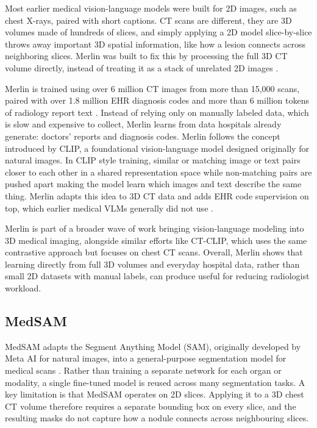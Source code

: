 Most earlier medical vision-language models were built for 2D images, such as chest X-rays, paired with short captions. CT scans are different,
they are 3D volumes made of hundreds of slices, and simply applying a 2D model slice-by-slice throws away important 3D spatial information,
like how a lesion connects across neighboring slices. Merlin was built to fix this by processing the full 3D CT volume directly,
instead of treating it as a stack of unrelated 2D images \cite{Blankemeier_2026}.

Merlin is trained using over 6 million CT images from more than 15,000 scans, paired with over 1.8 million EHR diagnosis codes and more than 6 million
tokens of radiology report text \cite{Blankemeier_2026}. Instead of relying only on manually labeled data, which is slow and expensive to collect,
Merlin learns from data hospitals already generate: doctors' reports and diagnosis codes. Merlin follows the concept introduced by CLIP,
a foundational vision-language model designed originally for natural images. In CLIP style training, similar or matching image or text pairs
closer to each other in a shared representation space while non-matching pairs are pushed apart making the model learn which images and text describe the same thing.
Merlin adapts this idea to 3D CT data and adds EHR code supervision on top, which earlier medical VLMs generally did not use \cite{Blankemeier_2026}.

Merlin is part of a broader wave of work bringing vision-language modeling into 3D medical imaging, alongside similar efforts like CT-CLIP,
which uses the same contrastive approach but focuses on chest CT scans\cite{Blankemeier_2026}. Overall, Merlin shows that learning directly
from full 3D volumes and everyday hospital data, rather than small 2D datasets with manual labels, can produce useful for reducing radiologist workload.

\subsection{MedSAM}

MedSAM adapts the Segment Anything Model (SAM), originally developed by Meta AI for natural images,
into a general-purpose segmentation model for medical scans \cite{ma2024medsam}.
Rather than training a separate network for each organ or modality, a single fine-tuned model is reused across many
segmentation tasks. A key limitation is that MedSAM operates on 2D slices.
Applying it to a 3D chest CT volume therefore requires a separate bounding box on every slice, 
and the resulting masks do not capture how a nodule connects across neighbouring slices. 

